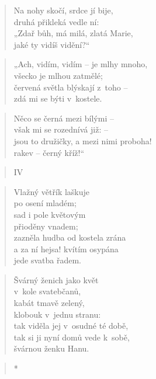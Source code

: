 \begin{verse}
Na nohy skočí, srdce jí bije, \\
druhá přikleká vedle ní: \\
„Zdař bůh, má milá, zlatá Marie, \\
jaké ty vidíš vidění?“
\end{verse}

\begin{verse}
„Ach, vidím, vidím -- je mlhy mnoho, \\
všecko je mlhou zatmělé; \\
červená světla blýskají z~toho -- \\
zdá mi se býti v~kostele.
\end{verse}

\begin{verse}
Něco se černá mezi bílými -- \\
však mi se rozednívá již: -- \\
jsou to družičky, a mezi nimi proboha! \\
rakev -- černý kříž!“
\end{verse}

\begin{verse}
IV
\end{verse}

\begin{verse}
Vlažný větřík laškuje \\
po osení mladém; \\
sad i pole květovým \\
přioděny vnadem; \\
zazněla hudba od kostela zrána \\
a za ní hejsa! kvítím osypána \\
jede svatba řadem.
\end{verse}

\begin{verse}
Švárný ženich jako květ \\
v~kole svatebčanů, \\
kabát tmavě zelený, \\
klobouk v~jednu stranu: \\
tak viděla jej v~osudné té době, \\
tak si ji nyní domů vede k~sobě, \\
švárnou ženku Hanu.
\end{verse}

\begin{verse}
*
\end{verse}

